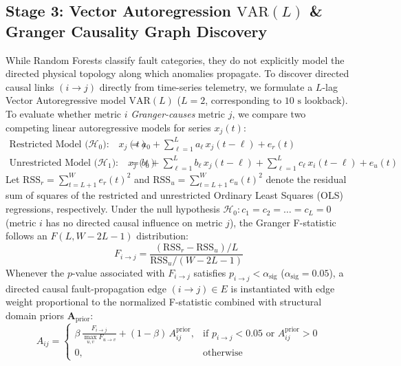 \subsection{Stage 3: Vector Autoregression $\text{VAR}(L)$ \& Granger Causality Graph Discovery}
While Random Forests classify fault categories, they do not explicitly model the directed physical topology along which anomalies propagate. To discover directed causal links $(i \to j)$ directly from time-series telemetry, we formulate a $L$-lag Vector Autoregressive model $\text{VAR}(L)$ ($L=2$, corresponding to $10\text{ s}$ lookback). To evaluate whether metric $i$ \textit{Granger-causes} metric $j$, we compare two competing linear autoregressive models for series $x_j(t)$:
\begin{align}
\text{Restricted Model ($\mathcal{H}_0$):} \quad x_j(t) &= a_0 + \sum_{\ell=1}^{L} a_\ell \, x_j(t - \ell) + e_r(t) \label{eq:var_restricted} \\
\text{Unrestricted Model ($\mathcal{H}_1$):} \quad x_j(t) &= b_0 + \sum_{\ell=1}^{L} b_\ell \, x_j(t - \ell) + \sum_{\ell=1}^{L} c_\ell \, x_i(t - \ell) + e_u(t) \label{eq:var_unrestricted}
\end{align}
Let $\text{RSS}_r = \sum_{t=L+1}^{W} e_r(t)^2$ and $\text{RSS}_u = \sum_{t=L+1}^{W} e_u(t)^2$ denote the residual sum of squares of the restricted and unrestricted Ordinary Least Squares (OLS) regressions, respectively. Under the null hypothesis $\mathcal{H}_0 : c_1 = c_2 = \dots = c_L = 0$ (metric $i$ has no directed causal influence on metric $j$), the Granger F-statistic follows an $F(L, W - 2L - 1)$ distribution:
\begin{equation}
F_{i \to j} = \frac{(\text{RSS}_r - \text{RSS}_u) / L}{\text{RSS}_u / (W - 2L - 1)}
\label{eq:granger_f}
\end{equation}
Whenever the $p$-value associated with $F_{i \to j}$ satisfies $p_{i \to j} < \alpha_{\text{sig}}$ ($\alpha_{\text{sig}} = 0.05$), a directed causal fault-propagation edge $(i \to j) \in E$ is instantiated with edge weight proportional to the normalized F-statistic combined with structural domain priors $\mathbf{A}_{\text{prior}}$:
\begin{equation}
A_{ij} = \begin{cases} 
\beta \, \frac{F_{i \to j}}{\max_{u,v} F_{u \to v}} + (1 - \beta) \, A_{ij}^{\text{prior}}, & \text{if } p_{i \to j} < 0.05 \text{ or } A_{ij}^{\text{prior}} > 0 \\
0, & \text{otherwise}
\end{cases}
\label{eq:adj_weight}
\end{equation}

